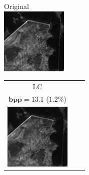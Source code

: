 \documentclass[runningheads]{llncs}
\begin{document}
\begin{figure}
\begin{minipage}{0.27\linewidth}
    \tiny
    Original\\
\includegraphics[width=1\linewidth]{figures/compression/original.png}
\end{minipage}
\tiny
\begin{tabular}{ccc}
   LC   & \begin{minipage}{0.27\linewidth}\tiny$n=4$\\$\textbf{bpp}=13.1$ ($1.2 \%$)\\ \includegraphics[width=\linewidth]{figures/compression/reconstruction4.png}   \end{minipage}%

\end{tabular}
\end{figure}
\end{document}

